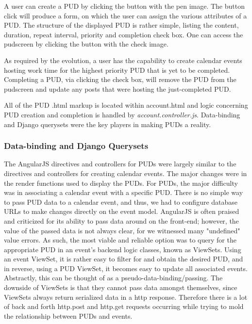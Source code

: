 \documentclass[a4paper]{article}
\begin{document}
A user can create a PUD by clicking the button with the pen image. The button click will produce a form, on which the user can assign the various attributes of a PUD. The structure of the displayed PUD is rather simple, listing the content, duration, repeat interval, priority and completion check box. One can access the pudscreen by clicking the button with the check image.

As required by the evolution, a user has the capability to create calendar events hosting work time for the highest priority PUD that is yet to be completed. Completing a PUD, via clicking the check box, will remove the PUD from the pudscreen and update any posts that were hosting the just-completed PUD.

All of the PUD .html markup is located within account.html and logic concerning PUD creation and completion is handled by \emph{account.controller.js}. Data-binding and Django querysets were the key players in making PUDs a reality.

\subsubsection{Data-binding and Django Querysets}

The AngularJS directives and controllers for PUDs were largely similar to the directives and controllers for creating calendar events. The major changes were in the render functions used to display the PUDs. For PUDs, the major difficulty was in associating a calendar event with a specific PUD. There is no simple way to pass PUD data to a calendar event, and thus, we had to configure database URLs to make changes directly on the event model. AngularJS is often praised and criticized for its ability to pass data around on the front-end; however, the value of the passed data is not always clear, for we witnessed many "undefined" value errors. As such, the most viable and reliable option was to query for the appropriate PUD in an event's backend logic classes, known as ViewSets. Using an event ViewSet, it is rather easy to filter for and obtain the desired PUD, and in reverse, using a PUD ViewSet, it becomes easy to update all associated events. Abstractly, this can be thought of as a pseudo-data-binding/passing. The downside of ViewSets is that they cannot pass data amongst themselves, since ViewSets always return serialized data in a http response. Therefore there is a lot of back and forth http.post and http.get requests occurring while trying to mold the relationship between PUDs and events.
\end{document}
